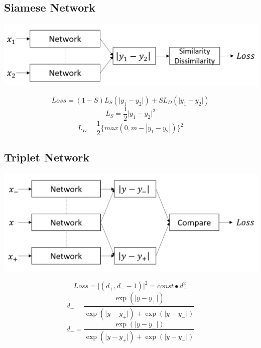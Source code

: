 \documentclass[a0,portrait]{a0poster}
\begin{document}
\begin{multicols}{2}
		
		\subsection*{Siamese Network}
		\begin{center}\vspace{1cm}
			\includegraphics[width=0.7\linewidth]{../report_shaoheng/siamese_struct}
		\end{center}\vspace{1cm}
		\begin{equation}
		Loss = (1-S)L_S(\lvert y_1 - y_2 \rvert) + S L_D(\lvert y_1 - y_2 \rvert)
		\end{equation}
		\begin{equation}
		L_S = \frac{1}{2}\lvert y_1 - y_2 \rvert^2
		\end{equation}
		\begin{equation}
		L_D = \frac{1}{2}\{max(0, m-|y_1-y_2|)\}^2
		\end{equation}
		\subsection*{Triplet Network}
		\begin{center}\vspace{1cm}
			\includegraphics[width=0.7\linewidth]{../report_shaoheng/triplet_struct}
		\end{center}\vspace{1cm}
		\begin{equation}
		Loss = \lvert(d_+, d_--1)\rvert^2 = const\bullet d_+^2
		\end{equation}
		\begin{equation}
		d_+ = \frac{\exp{(\lvert y-y_+ \rvert)}}{\exp{(\lvert y-y_+ \rvert)} + \exp{(\lvert y-y_- \rvert)}}
		\end{equation}
		\begin{equation}
		d_- = \frac{\exp{(\lvert y-y_- \rvert)}}{\exp{(\lvert y-y_+ \rvert)} + \exp{(\lvert y-y_- \rvert)}}
		\end{equation}

\end{multicols}
\end{document}
